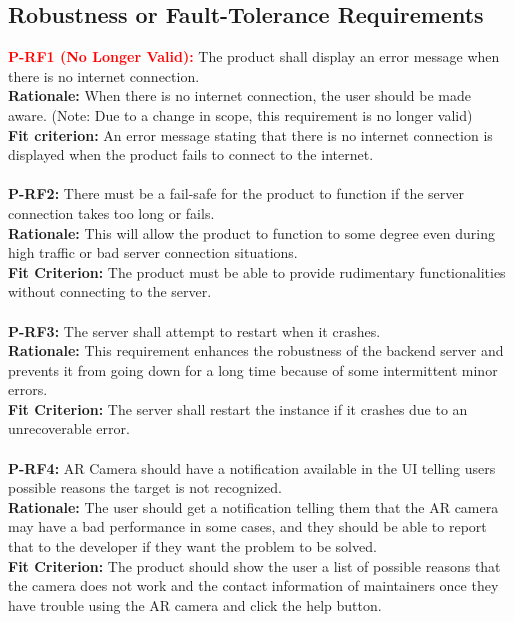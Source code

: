 \documentclass[12pt]{article}
\begin{document}
\subsection{Robustness or Fault-Tolerance Requirements}
  \textbf{\textcolor{red}{P-RF1 (No Longer Valid):}} The product shall display an error message when there is no internet connection.\\
  \textbf{Rationale:} When there is no internet connection, the user should be made aware. (Note: Due to a change in scope, this requirement is no longer valid)\\
  \textbf{Fit criterion:} An error message stating that there is no internet connection is displayed when the product fails to connect to the internet.\\\\
  \textbf{P-RF2:} There must be a fail-safe for the product to function if the server connection takes too long or fails.\\
  \textbf{Rationale:} This will allow the product to function to some degree even during high traffic or bad server connection situations.\\
  \textbf{Fit Criterion:} The product must be able to provide rudimentary functionalities without connecting to the server.\\\\
  \textbf{P-RF3:} The server shall attempt to restart when it crashes.\\
  \textbf{Rationale:} This requirement enhances the robustness of the backend server and prevents it from going down for a long time because of some intermittent minor errors.\\
  \textbf{Fit Criterion:} The server shall restart the instance if it crashes due to an unrecoverable error.\\\\
  \textbf{P-RF4:} AR Camera should have a notification available in the UI telling users possible reasons the target is not recognized.\\
  \textbf{Rationale:} The user should get a notification telling them that the AR camera may have a bad performance in some cases, and they should be able to report that to the developer if they want the problem to be solved.\\
  \textbf{Fit Criterion:} The product should show the user a list of possible reasons that the camera does not work and the contact information of maintainers once they have trouble using the AR camera and click the help button.\\\\
\end{document}
